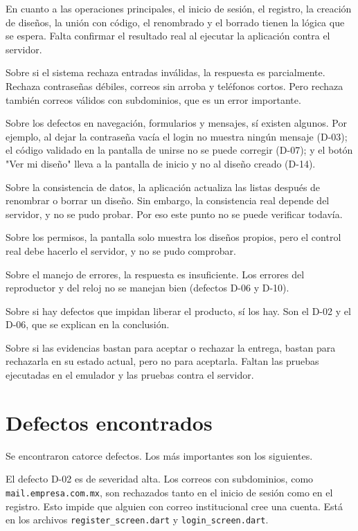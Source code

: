 \documentclass[11pt,a4paper]{article}
\begin{document}
En cuanto a las operaciones principales, el inicio de sesión, el registro, la creación de diseños, la unión con código, el renombrado y el borrado tienen la lógica que se espera. Falta confirmar el resultado real al ejecutar la aplicación contra el servidor.

Sobre si el sistema rechaza entradas inválidas, la respuesta es parcialmente. Rechaza contraseñas débiles, correos sin arroba y teléfonos cortos. Pero rechaza también correos válidos con subdominios, que es un error importante.

Sobre los defectos en navegación, formularios y mensajes, sí existen algunos. Por ejemplo, al dejar la contraseña vacía el login no muestra ningún mensaje (D-03); el código validado en la pantalla de unirse no se puede corregir (D-07); y el botón "Ver mi diseño" lleva a la pantalla de inicio y no al diseño creado (D-14).

Sobre la consistencia de datos, la aplicación actualiza las listas después de renombrar o borrar un diseño. Sin embargo, la consistencia real depende del servidor, y no se pudo probar. Por eso este punto no se puede verificar todavía.

Sobre los permisos, la pantalla solo muestra los diseños propios, pero el control real debe hacerlo el servidor, y no se pudo comprobar.

Sobre el manejo de errores, la respuesta es insuficiente. Los errores del reproductor y del reloj no se manejan bien (defectos D-06 y D-10).

Sobre si hay defectos que impidan liberar el producto, sí los hay. Son el D-02 y el D-06, que se explican en la conclusión.

Sobre si las evidencias bastan para aceptar o rechazar la entrega, bastan para rechazarla en su estado actual, pero no para aceptarla. Faltan las pruebas ejecutadas en el emulador y las pruebas contra el servidor.

\section*{Defectos encontrados}

Se encontraron catorce defectos. Los más importantes son los siguientes.

El defecto D-02 es de severidad alta. Los correos con subdominios, como \texttt{mail.empresa.com.mx}, son rechazados tanto en el inicio de sesión como en el registro. Esto impide que alguien con correo institucional cree una cuenta. Está en los archivos \texttt{register\_screen.dart} y \texttt{login\_screen.dart}.
\end{document}
